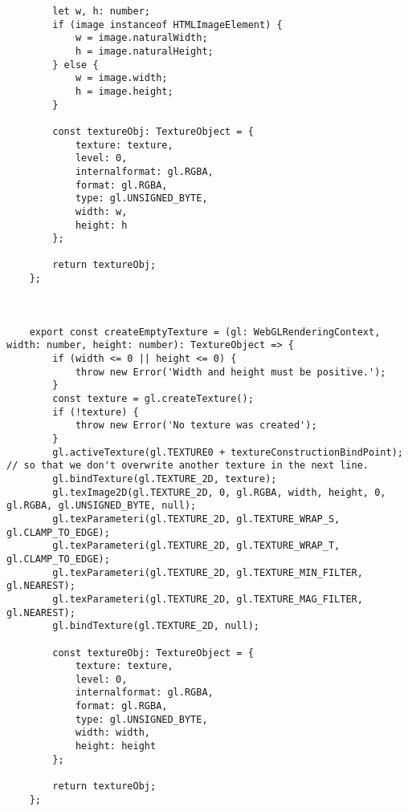 {\begin{lstlisting}
        let w, h: number;
        if (image instanceof HTMLImageElement) {
            w = image.naturalWidth;
            h = image.naturalHeight;
        } else {
            w = image.width;
            h = image.height;
        }
    
        const textureObj: TextureObject = {
            texture: texture,
            level: 0,
            internalformat: gl.RGBA,
            format: gl.RGBA,
            type: gl.UNSIGNED_BYTE,
            width: w,
            height: h
        };
    
        return textureObj;
    };
    
    
    
    export const createEmptyTexture = (gl: WebGLRenderingContext, width: number, height: number): TextureObject => {
        if (width <= 0 || height <= 0) {
            throw new Error('Width and height must be positive.');
        }
        const texture = gl.createTexture();
        if (!texture) {
            throw new Error('No texture was created');
        }
        gl.activeTexture(gl.TEXTURE0 + textureConstructionBindPoint); // so that we don't overwrite another texture in the next line.
        gl.bindTexture(gl.TEXTURE_2D, texture);
        gl.texImage2D(gl.TEXTURE_2D, 0, gl.RGBA, width, height, 0, gl.RGBA, gl.UNSIGNED_BYTE, null);
        gl.texParameteri(gl.TEXTURE_2D, gl.TEXTURE_WRAP_S, gl.CLAMP_TO_EDGE);
        gl.texParameteri(gl.TEXTURE_2D, gl.TEXTURE_WRAP_T, gl.CLAMP_TO_EDGE);
        gl.texParameteri(gl.TEXTURE_2D, gl.TEXTURE_MIN_FILTER, gl.NEAREST);
        gl.texParameteri(gl.TEXTURE_2D, gl.TEXTURE_MAG_FILTER, gl.NEAREST);
        gl.bindTexture(gl.TEXTURE_2D, null);
    
        const textureObj: TextureObject = {
            texture: texture,
            level: 0,
            internalformat: gl.RGBA,
            format: gl.RGBA,
            type: gl.UNSIGNED_BYTE,
            width: width,
            height: height
        };
    
        return textureObj;
    };
    

\end{lstlisting}}
